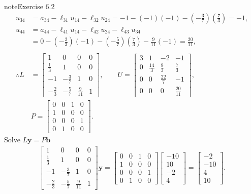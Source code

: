 \documentclass[letterpaper,10pt,english]{jupyterBook}
\begin{document}
\begin{sphinxadmonition}{note}{Exercise 6.2}
\begin{align*}
    u_{34} &= a_{34} - \ell_{31} u_{14} - \ell_{32} u_{24} = -1 - \left(-1\right)\left(-1\right) - \left(- \frac{3}{7}\right)\left(\frac{7}{3}\right) = -1, \\
    u_{44} &= a_{44} - \ell_{41} u_{14} - \ell_{42} u_{24} - \ell_{43} u_{34} \\
    &= 0 - \left(- \frac{2}{3}\right)\left(-1\right) - \left(- \frac{5}{7}\right)\left(\frac{7}{3}\right) - \frac{9}{11}\left(-1\right) = \frac{20}{11}, \\
    \\
    \therefore L &= \left[\begin{matrix}1 & 0 & 0 & 0\\\frac{1}{3} & 1 & 0 & 0\\-1 & - \frac{3}{7} & 1 & 0\\- \frac{2}{3} & - \frac{5}{7} & \frac{9}{11} & 1\end{matrix}\right], \qquad
    U = \left[\begin{matrix}3 & 1 & -2 & -1\\0 & \frac{14}{3} & \frac{8}{3} & \frac{7}{3}\\0 & 0 & \frac{22}{7} & -1\\0 & 0 & 0 & \frac{20}{11}\end{matrix}\right], \\
    & P = \left[\begin{matrix}0 & 0 & 1 & 0\\1 & 0 & 0 & 0\\0 & 0 & 0 & 1\\0 & 1 & 0 & 0\end{matrix}\right].
\end{align*}
\sphinxAtStartPar
Solve \(L \mathbf{y} = P \mathbf{b}\)
\begin{align*} \left[\begin{matrix}1 & 0 & 0 & 0\\\frac{1}{3} & 1 & 0 & 0\\-1 & - \frac{3}{7} & 1 & 0\\- \frac{2}{3} & - \frac{5}{7} & \frac{9}{11} & 1\end{matrix}\right] \mathbf{y} = \left[\begin{matrix}0 & 0 & 1 & 0\\1 & 0 & 0 & 0\\0 & 0 & 0 & 1\\0 & 1 & 0 & 0\end{matrix}\right] \left[\begin{matrix}-10\\10\\-2\\4\end{matrix}\right] = \left[\begin{matrix}-2\\-10\\4\\10\end{matrix}\right]. \end{align*}\begin{align*}

\end{align*}
\end{sphinxadmonition}
\end{document}
